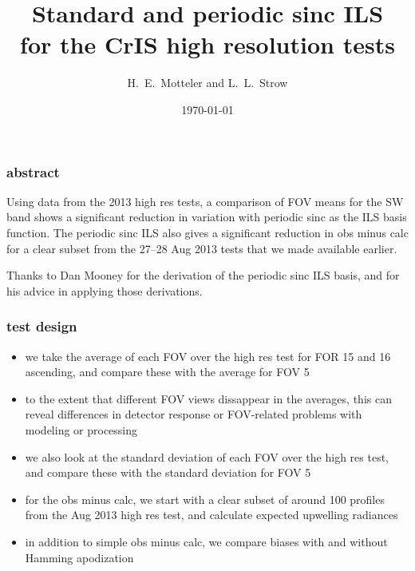 \documentclass[11pt]{beamer}
\title{Standard and periodic sinc ILS \\
  for the CrIS high resolution tests}
\author{H.~E.~Motteler and L.~L.~Strow}
\institute{
  UMBC Atmospheric Spectroscopy Lab \\
  Joint Center for Earth Systems Technology \\
}
\date{\today}
\begin{document}
\begin{frame}[plain]
\titlepage
\end{frame}
\begin{frame}
\frametitle{abstract}

Using data from the 2013 high res tests, a comparison of FOV means
for the SW band shows a significant reduction in variation with periodic
sinc as the ILS basis function.  The periodic sinc ILS also gives a
significant reduction in obs minus calc for a clear subset from the
27--28 Aug 2013 tests that we made available earlier.

\hspace{4cm}

Thanks to Dan Mooney for the derivation of the periodic sinc ILS
basis, and for his advice in applying those derivations.

\end{frame}
\begin{frame}
\frametitle{test design}

\begin{itemize}
  \item we take the average of each FOV over the high res test for
    FOR 15 and 16 ascending, and compare these with the average for
    FOV 5

  \item to the extent that different FOV views dissappear in the
    averages, this can reveal differences in detector response or
    FOV-related problems with modeling or processing

  \item we also look at the standard deviation of each FOV over the
    high res test, and compare these with the standard deviation for
    FOV 5

  \item for the obs minus calc, we start with a clear subset of
    around 100 profiles from the Aug 2013 high res test, and
    calculate expected upwelling radiances

  \item in addition to simple obs minus calc, we compare biases with
    and without Hamming apodization

\end{itemize}

\end{frame}
\end{document}
